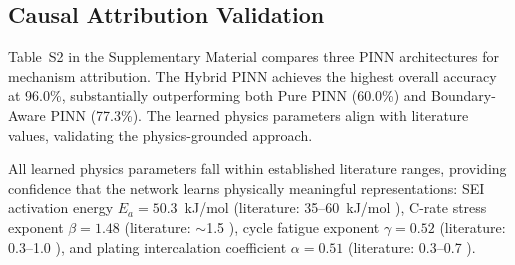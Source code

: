 \documentclass[5p,times,authoryear]{elsarticle}
\begin{document}
\subsection{Causal Attribution Validation}


Table~S2 in the Supplementary Material compares three PINN architectures for mechanism attribution. The Hybrid PINN achieves the highest overall accuracy at 96.0\%, substantially outperforming both Pure PINN (60.0\%) and Boundary-Aware PINN (77.3\%).
The learned physics parameters align with literature values, validating the physics-grounded approach.

\begin{table}[!htb]
\caption{Ablation Study: Component Contributions to Hybrid PINN}
\begin{center}
\end{center}
\label{tab:ablation}
\end{table}

All learned physics parameters fall within established literature ranges, providing confidence that the network learns physically meaningful representations: SEI activation energy $E_a = 50.3$~kJ/mol (literature: 35--60~kJ/mol \citep{broussely2005main}), C-rate stress exponent $\beta = 1.48$ (literature: $\sim$1.5 \citep{zhang2020degradation}), cycle fatigue exponent $\gamma = 0.52$ (literature: 0.3--1.0 \citep{reniers2019review}), and plating intercalation coefficient $\alpha = 0.51$ (literature: 0.3--0.7 \citep{waldmann2014temperature}).
\end{document}
